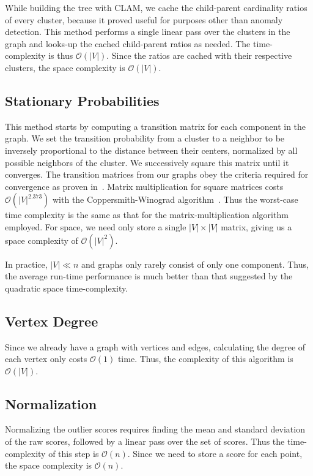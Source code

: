 While building the tree with CLAM, we cache the child-parent cardinality ratios of every cluster, because it proved useful for purposes other than anomaly detection.
This method performs a single linear pass over the clusters in the graph and looks-up the cached child-parent ratios as needed.
The time-complexity is thus $\mathcal{O}(|V|)$.
Since the ratios are cached with their respective clusters, the space complexity is $\mathcal{O}(|V|)$.

\subsection{Stationary Probabilities}

This method starts by computing a transition matrix for each component in the graph.
We set the transition probability from a cluster to a neighbor to be inversely proportional to the distance between their centers, normalized by all possible neighbors of the cluster.
We successively square this matrix until it converges.
The transition matrices from our graphs obey the criteria required for convergence as proven in~\cite{levin2017markov}.
Matrix multiplication for square matrices costs $\mathcal{O}(|V|^{2.373})$ with the Coppersmith-Winograd algorithm~\cite{coppersmith1987matrix}.
Thus the worst-case time complexity is the same as that for the matrix-multiplication algorithm employed.
For space, we need only store a single $|V| \times |V|$ matrix, giving us a space complexity of $\mathcal{O}(|V|^2)$.

In practice, $|V| \ll n$ and graphs only rarely consist of only one component.
Thus, the average run-time performance is much better than that suggested by the quadratic space time-complexity.

\subsection{Vertex Degree}

Since we already have a graph with vertices and edges, calculating the degree of each vertex only costs $\mathcal{O}(1)$ time.
Thus, the complexity of this algorithm is $\mathcal{O}(|V|)$.

\subsection{Normalization}

Normalizing the outlier scores requires finding the mean and standard deviation of the raw scores, followed by a linear pass over the set of scores.
Thus the time-complexity of this step is $\mathcal{O}(n)$.
Since we need to store a score for each point, the space complexity is $\mathcal{O}(n)$.

